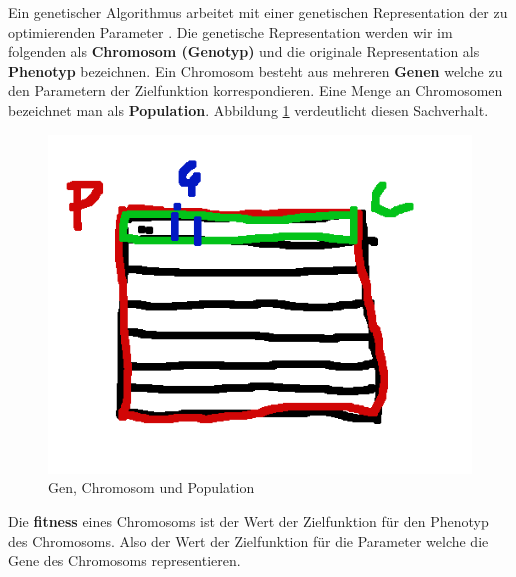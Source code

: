 Ein genetischer Algorithmus arbeitet mit einer genetischen Representation der zu optimierenden Parameter \cite*{TerminologiesAndOperators}. Die genetische Representation werden wir im folgenden als \textbf{Chromosom (Genotyp)}  und die originale Representation als \textbf{Phenotyp} bezeichnen. Ein Chromosom besteht aus mehreren \textbf{Genen} welche zu den Parametern der Zielfunktion korrespondieren. Eine Menge an Chromosomen bezeichnet man als \textbf{Population}. Abbildung \ref*{fig:population_chromosome_gene} verdeutlicht diesen Sachverhalt. 
\begin{figure}[h!]
    \includegraphics[scale=1.0]{images/Population_Chromosom_Gen.png}
    \caption{Gen, Chromosom und Population}
    \label{fig:population_chromosome_gene}
\end{figure}

Die \textbf{fitness} eines Chromosoms ist der Wert der Zielfunktion für den Phenotyp des Chromosoms. Also der Wert der Zielfunktion für die Parameter welche die Gene des Chromosoms representieren.


